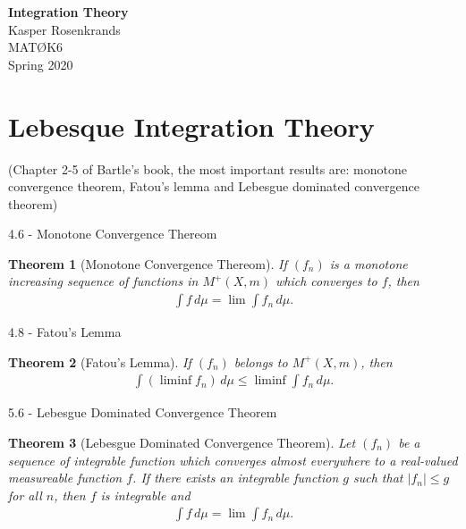 \documentclass{article}
\newtheorem{theorem}{Theorem}[section]
\numberwithin{equation}{section}
\begin{document}
\thispagestyle{empty}
\begin{center}
{\huge\textbf{Integration Theory}}\\[2mm]
{\Large Kasper Rosenkrands}\\[2cm]
{\large MATØK6}\\[2mm]
{\large Spring 2020}
\end{center}

\newpage


\section{Lebesque Integration Theory}
(Chapter 2-5 of Bartle's book, the most important results are: monotone convergence theorem, Fatou's lemma and Lebesgue dominated convergence theorem)

4.6 - Monotone Convergence Thereom

\begin{theorem}[Monotone Convergence Thereom]
    If $(f_n)$ is a monotone increasing sequence of functions in $M^+(X,m)$ which converges to $f$, then
    \begin{align}\label{eq:b4.6}
        \int f \,d\mu = \lim \int f_n  \,d\mu. 
    \end{align}
\end{theorem}

4.8 - Fatou's Lemma

\begin{theorem}[Fatou's Lemma]
    If $(f_n)$ belongs to $M^+(X,m)$, then
    \begin{align}\label{eq:b4.8}
        \int (\liminf f_n) \, d\mu \leq \liminf \int f_n \, d\mu.
    \end{align}
\end{theorem}

5.6 - Lebesgue Dominated Convergence Theorem

\begin{theorem}[Lebesgue Dominated Convergence Theorem]
    Let $(f_n)$ be a sequence of integrable function which converges almost everywhere to a real-valued measureable function $f$.
    If there exists an integrable function $g$ such that $|f_n|\leq g$ for all $n$, then $f$ is integrable and
    \begin{align}\label{eq:b5.4}
        \int f \, d\mu = \lim \int f_n \, d\mu.
    \end{align}
\end{theorem}
\end{document}
